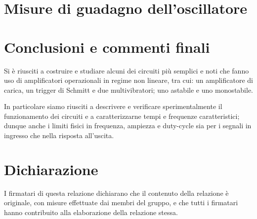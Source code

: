 \documentclass[10pt, a4paper, italian]{article}
\begin{document}
\section{Misure di guadagno dell'oscillatore}

\section*{Conclusioni e commenti finali}
Si è riusciti a costruire e studiare alcuni dei circuiti più semplici e noti
che fanno uso di amplificatori operazionali in regime non lineare, tra cui:
un amplificatore di carica, un trigger di Schmitt e due multivibratori; uno
astabile e uno monostabile.

In particolare siamo riusciti a descrivere e verificare sperimentalmente il
funzionamento dei circuiti e a caratterizzarne tempi e frequenze
caratteristici; dunque anche i limiti fisici in frequenza, ampiezza e
duty-cycle sia per i segnali in ingresso che nella risposta all'uscita.

\section*{Dichiarazione}
I firmatari di questa relazione dichiarano che il contenuto della relazione \`e
originale, con misure effettuate dai membri del gruppo, e che tutti i firmatari
hanno contribuito alla elaborazione della relazione stessa.
\end{document}
